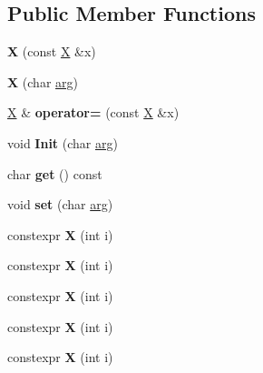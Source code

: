 \subsection*{Public Member Functions}
\begin{DoxyCompactItemize}
\item 
\mbox{\label{class_x_a21e9c5a8bee6a88fc4726ff66ce202ae}} 
{\bfseries X} (const \mbox{\hyperlink{class_x}{X}} \&x)
\item 
\mbox{\label{class_x_af6af305575d039b7c669f212310d9202}} 
{\bfseries X} (char \mbox{\hyperlink{unionarg}{arg}})
\item 
\mbox{\label{class_x_a0bda65ea882e9ec42e4c845ba3bc00d7}} 
\mbox{\hyperlink{class_x}{X}} \& {\bfseries operator=} (const \mbox{\hyperlink{class_x}{X}} \&x)
\item 
\mbox{\label{class_x_a9375c5612a2e0698c2379eef912363fb}} 
void {\bfseries Init} (char \mbox{\hyperlink{unionarg}{arg}})
\item 
\mbox{\label{class_x_a6c88f272f320076f1d795a109dc3ef90}} 
char {\bfseries get} () const
\item 
\mbox{\label{class_x_aa5c67f82786a60094794e60feedb38a2}} 
void {\bfseries set} (char \mbox{\hyperlink{unionarg}{arg}})
\item 
\mbox{\label{class_x_acb10a534a7ab0dafa80c9ff2401e41bf}} 
constexpr {\bfseries X} (int i)
\item 
\mbox{\label{class_x_acb10a534a7ab0dafa80c9ff2401e41bf}} 
constexpr {\bfseries X} (int i)
\item 
\mbox{\label{class_x_acb10a534a7ab0dafa80c9ff2401e41bf}} 
constexpr {\bfseries X} (int i)
\item 
\mbox{\label{class_x_acb10a534a7ab0dafa80c9ff2401e41bf}} 
constexpr {\bfseries X} (int i)
\item 
\mbox{\label{class_x_acb10a534a7ab0dafa80c9ff2401e41bf}} 
constexpr {\bfseries X} (int i)
\item 
\mbox{\label{class_x_acb10a534a7ab0dafa80c9ff2401e41bf}} 

\end{DoxyCompactItemize}
